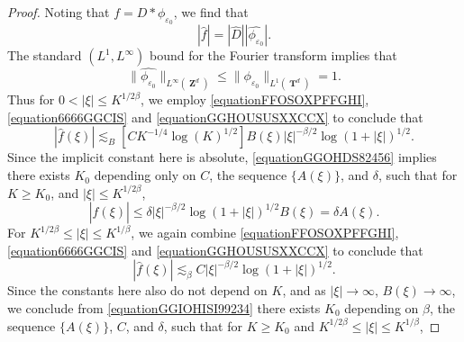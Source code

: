 \documentclass[12pt,reqno]{article}
\numberwithin{equation}{section}
\DeclareMathOperator{\ZZ}{\mathbf{Z}}
\DeclareMathOperator{\TT}{\mathbf{T}}
\begin{document}
\begin{proof}
%
%
%
%
    Noting that $f = D * \phi_{\varepsilon_0}$, we find that
    \begin{equation} \label{equation6666GGCIS}
        |\widehat{f}| = |\widehat{D}| |\widehat{\phi_{\varepsilon_0}}|.
    \end{equation}
    The standard $(L^1,L^\infty)$ bound for the Fourier transform implies that
    \begin{equation} \label{equationGGHOUSUSXXCCX}
        \| \widehat{\phi_{\varepsilon_0}} \|_{L^\infty(\ZZ^d)} \leq \| \phi_{\varepsilon_0} \|_{L^1(\TT^d)} = 1.
    \end{equation}
    Thus for $0 < |\xi| \leq K^{1/2\beta}$, we employ \eqref{equationFFOSOXPFFGHI}, \eqref{equation6666GGCIS} and \eqref{equationGGHOUSUSXXCCX} to conclude that
    \begin{equation} \label{equationGGOHDS82456}
        |\widehat{f}(\xi)| \lesssim_B \left[ C K^{-1/4} \log(K)^{1/2} \right] B(\xi) |\xi|^{-\beta/2} \log(1 + |\xi|)^{1/2}.
    \end{equation}
    Since the implicit constant here is absolute, \eqref{equationGGOHDS82456} implies there exists $K_0$ depending only on $C$, the sequence $\{ A(\xi) \}$, and $\delta$, such that for $K \geq K_0$, and $|\xi| \leq K^{1/2\beta}$,
    \begin{equation} \label{equationYYYUFUSSCS}
        |\widehat{f}(\xi)| \leq \delta |\xi|^{-\beta/2} \log(1 + |\xi|)^{1/2} B(\xi) = \delta A(\xi).
    \end{equation}
    For $K^{1/2\beta} \leq |\xi| \leq K^{1/\beta}$, we again combine \eqref{equationFFOSOXPFFGHI}, \eqref{equation6666GGCIS} and \eqref{equationGGHOUSUSXXCCX} to conclude that
    \begin{equation} \label{equationGGIOHISI99234}
        |\widehat{f}(\xi)| \lesssim_\beta C |\xi|^{-\beta/2} \log(1 + |\xi|)^{1/2}.
    \end{equation}
    Since the constants here also do not depend on $K$, and as $|\xi | \to \infty$, $B(\xi) \to \infty$, we conclude from \eqref{equationGGIOHISI99234} there exists $K_0$ depending on $\beta$, the sequence $\{ A(\xi) \}$, $C$, and $\delta$, such that for $K \geq K_0$ and $K^{1/2\beta} \leq |\xi| \leq K^{1/\beta}$,

\end{proof}
\end{document}
